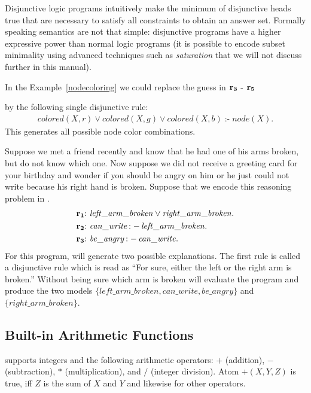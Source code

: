 \documentclass[a4paper, titlepage]{article}
\DeclareMathOperator{\leftimpl}{:-}
\newcommand{\row}[1]{%
  \ensuremath{\color{black}\ensuremath{\mathbf{#1}} \color{black}}%
}
\newcommand{\rowprefix}[1]{%
  \ensuremath{\color{black}\mathbf{#1{:}}\ }%
}
\begin{document}
Disjunctive logic programs intuitively make
the minimum of disjunctive heads true
that are necessary to satisfy all constraints to obtain an answer set.
%
Formally speaking semantics are not that simple:
disjunctive programs have a higher expressive power
than normal logic programs
(it is possible to encode subset minimality
using advanced techniques such as \emph{saturation}
that we will not discuss further in this manual).

\begin{exmp}
In the Example~\ref{nodecoloring} we could replace
the guess in \row{r_3}-\row{r_5}
by the following single disjunctive rule:
\begin{align*}
\mathit{colored(X,r)} \vee \mathit{colored(X,g)} \vee \mathit{colored(X,b)} \leftimpl \mathit{node(X).}
\end{align*}
This generates all possible node color combinations.
\end{exmp}

\begin{exmp}
Suppose we met a friend recently and know that he had one 
of his arms broken, but do not know which one. Now suppose 
we did not receive a greeting card for your birthday and 
wonder if you should be angry on him or he just could not 
write because his right hand is broken. 
Suppose that we encode this reasoning problem in \hex.
\begin{align*}
\rowprefix{r_1}& \mathit{left\_arm\_broken} \vee 
\mathit{right\_arm\_broken}.\\
\rowprefix{r_2}& \mathit{can\_write} \leftimpl 
\mathit{left\_arm\_broken}.\\
\rowprefix{r_3}& \mathit{be\_angry} \leftimpl 
\mathit{can\_write}.
\end{align*}
For this program,
\dlvhex{} will generate two possible explanations. The 
first rule is called a disjunctive rule which is read as 
\enquote{For sure, either the left or the right arm is broken.} Without being sure which arm is broken \dlvhex{} 
will evaluate the program and produce the two models 
$\mathit{\{left\_arm\_broken, can\_write, be\_angry\}}$ and 
$\mathit{\{right\_arm\_broken\}}$.
\end{exmp}

\subsection{Built-in Arithmetic Functions}
\dlvhex{} supports 
integers and the following arithmetic operators:
$+$ (addition), $-$ (subtraction),
$*$ (multiplication), and $/$ (integer division). 
Atom $+(X,Y,Z)$ is true,
iff $Z$ is the sum of $X$ and $Y$
and likewise for other operators.
\end{document}
